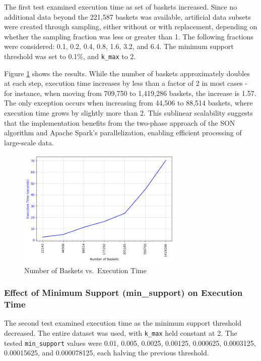 \documentclass{Class/julia}
\begin{document}
The first test examined execution time as set of baskets increased. Since no additional data beyond the 221,587 baskets was available, artificial data subsets were created through sampling, either without or with replacement, depending on whether the sampling fraction was less or greater than 1. The following fractions were considered: 0.1, 0.2, 0.4, 0.8, 1.6, 3.2, and 6.4. The minimum support threshold was set to 0.1\%, and \texttt{k\_max} to 2.

Figure \ref{fig:n_baskets_vs_execution_time} shows the results. While the number of baskets approximately doubles at each step, execution time increases by less than a factor of 2 in most cases - for instance, when moving from 709,750 to 1,419,286 baskets, the increase is 1.57. The only exception occurs when increasing from 44,506 to 88,514 baskets, where execution time grows by slightly more than 2. This sublinear scalability suggests that the implementation benefits from the two-phase approach of the SON algorithm and Apache Spark’s parallelization, enabling efficient processing of large-scale data.

\begin{figure}[!ht]
    \centering
    \includegraphics[width=0.7\textwidth]{n_baskets_vs_execution_time.png}
    \caption{Number of Baskets vs.\ Execution Time}
    \label{fig:n_baskets_vs_execution_time}
\end{figure}

\subsubsection{Effect of Minimum Support (min\_support) on Execution Time}

The second test examined execution time as the minimum support threshold decreased. The entire dataset was used, with \texttt{k\_max} held constant at 2. The tested \texttt{min\_support} values were 0.01, 0.005, 0.0025, 0.00125, 0.000625, 0.0003125, 0.00015625, and 0.000078125, each halving the previous threshold.  
\end{document}
